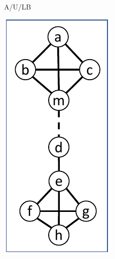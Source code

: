 \documentclass{article}
\begin{document}
\begin{figure}[t]
\begin{subfigure}{0.09\textwidth}
            \caption{A/U/LB}
            \label{fig:distance1_util_unsafe_add_LB}
        \end{subfigure}
                \hfill
                \begin{subfigure}{0.09\textwidth}
            \centering
            \includegraphics[page=3,width=\textwidth]{Graphs/Distance_1_paper.pdf}

\end{subfigure}
\end{figure}
\end{document}
